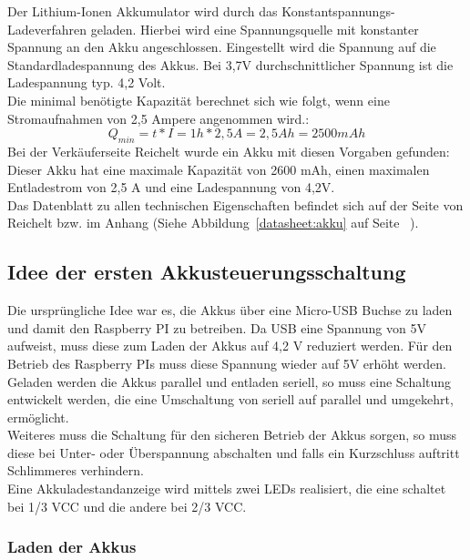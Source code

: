 \documentclass[12pt,a4paper]{article}
\begin{document}
Der Lithium-Ionen Akkumulator wird durch das Konstantspannungs-Ladeverfahren geladen. Hierbei wird eine Spannungsquelle mit konstanter Spannung an den Akku angeschlossen. Eingestellt wird die Spannung auf die Standardladespannung des Akkus. Bei 3,7V durchschnittlicher Spannung ist die Ladespannung typ. 4,2 Volt. \\
Die minimal benötigte Kapazität berechnet sich wie folgt, wenn eine Stromaufnahmen von 2,5 Ampere angenommen wird.:
\[Q_{min} = t*I = 1h * 2,5A = 2,5 Ah = 2500 mAh\]
Bei der Verkäuferseite Reichelt wurde ein Akku mit diesen Vorgaben gefunden: \cite{akku-liion}\\
Dieser Akku hat eine maximale Kapazität von 2600 mAh, einen maximalen Entladestrom von 2,5 A und eine Ladespannung von 4,2V. \\[1ex]
Das Datenblatt zu allen technischen Eigenschaften befindet sich auf der Seite von Reichelt \cite{akku-liion} bzw. im Anhang (Siehe Abbildung~\ref{datasheet:akku} auf Seite ~\pageref{datasheet:akku}).

\subsection{Idee der ersten Akkusteuerungsschaltung}
\label{SUBSEC:AKKUSTEUR1}

Die ursprüngliche Idee war es, die Akkus über eine Micro-USB Buchse zu laden und damit den Raspberry PI zu betreiben. Da USB eine Spannung von 5V aufweist, muss diese zum Laden der Akkus auf 4,2 V reduziert werden. Für den Betrieb des Raspberry PIs muss diese Spannung wieder auf 5V erhöht werden. \\
Geladen werden die Akkus parallel und entladen seriell, so muss eine Schaltung entwickelt werden, die eine Umschaltung von seriell auf parallel und umgekehrt, ermöglicht. \\
Weiteres muss die Schaltung für den sicheren Betrieb der Akkus sorgen, so muss diese bei Unter- oder Überspannung abschalten und falls ein Kurzschluss auftritt Schlimmeres verhindern. \\
Eine Akkuladestandanzeige wird mittels zwei LEDs realisiert, die eine schaltet bei 1/3 VCC und die andere bei 2/3 VCC. 

\subsubsection{Laden der Akkus}
\label{SUBSUBSEC:AKKULOAD1}
\end{document}
